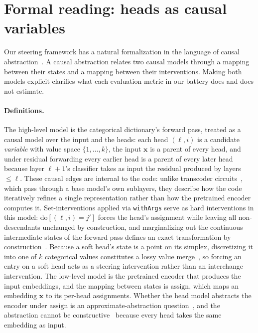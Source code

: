 \section{Formal reading: heads as causal variables}
\label{sec:formal}

Our steering framework has a natural formalization in the language of
causal abstraction~\cite{rubenstein2017,beckers2019,geiger2021,geiger2025}.
A causal abstraction relates two causal models through a mapping between
their states and a mapping between their interventions. Making both
models explicit clarifies what each evaluation metric in our battery does
and does not estimate.

\paragraph{Definitions.}
The high-level model is the categorical dictionary's forward pass, treated
as a causal model over the input and the heads: each head $(\ell,i)$ is a
candidate \emph{variable} with value space $\{1,\dots,k\}$, the input
$\mathbf{x}$ is a parent of every head, and under residual forwarding
every earlier head is a parent of every later head because layer
$\ell{+}1$'s classifier takes as input the residual produced by layers
$\le \ell$. These causal edges are internal to the code: unlike
transcoder circuits~\cite{dunefsky2024}, which pass through a base
model's own sublayers, they describe how the code iteratively refines a
single representation rather than how the pretrained encoder computes it.
Set-interventions applied via \texttt{withArgs} serve as hard
interventions in this model: $\mathrm{do}[(\ell,i){=}j']$ forces the
head's assignment while leaving all non-descendants unchanged by
construction, and marginalizing out the continuous intermediate states of
the forward pass defines an exact transformation by
construction~\cite[Thm.~10]{rubenstein2017}. Because a soft head's state
is a point on its simplex, discretizing it into one of $k$ categorical
values constitutes a lossy value merge~\cite{geiger2025}, so forcing an
entry on a soft head acts as a steering intervention rather than an
interchange intervention. The low-level model is the pretrained encoder
that produces the input embeddings, and the mapping between states is
$\mathrm{assign}$, which maps an embedding $\mathbf{x}$ to its per-head
assignments. Whether the head model abstracts the encoder under
$\mathrm{assign}$ is an approximate-abstraction
question~\cite[Def.~41]{geiger2025}, and the abstraction cannot be
constructive~\cite{beckers2019} because every head takes the same
embedding as input.

